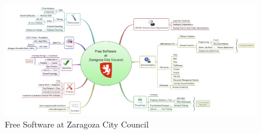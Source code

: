      \begin{figure}[H]
     \centering
         \includegraphics[scale=0.30,angle=90]{img/aytozgz.png} 
       \caption[Free Software at Zaragoza City Council]{Free Software at Zaragoza City Council \protect\footnotemark}
       \label{fig:FsZ}
         \end{figure}
     \newpage
